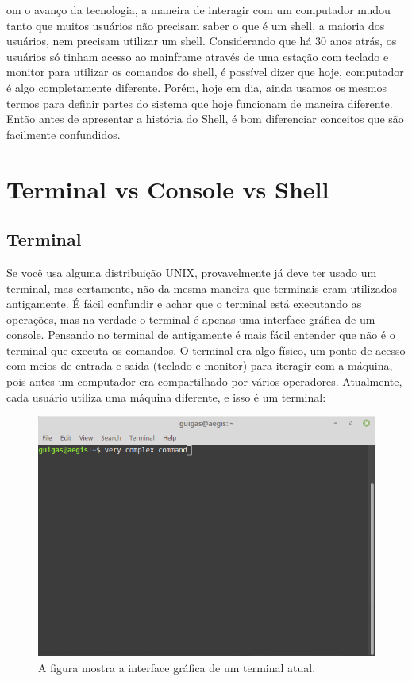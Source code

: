 	
	 om o avanço da tecnologia, a maneira de interagir com um computador mudou tanto que muitos usuários não precisam saber o que é um shell, a maioria dos usuários, nem precisam utilizar um shell.
	Considerando que há 30 anos atrás, os usuários só tinham acesso ao mainframe através de uma estação com teclado e monitor para utilizar os comandos do shell, é possível dizer que hoje, computador é algo completamente diferente. Porém, hoje em dia, ainda usamos os mesmos termos para definir partes do sistema que hoje funcionam de maneira diferente. Então antes de apresentar a história do Shell, é bom diferenciar conceitos que são facilmente confundidos.
	
	\section{Terminal vs Console vs Shell}
	
	\subsection{Terminal}
	Se você usa alguma distribuição UNIX, provavelmente já deve ter usado um terminal, mas certamente, não da mesma maneira que terminais eram utilizados antigamente. É fácil confundir e achar que o terminal está executando as operações, mas na verdade o terminal é apenas uma interface gráfica de um console. Pensando no terminal de antigamente é mais fácil entender que não é o terminal que executa os comandos. O terminal era algo físico, um ponto de acesso com meios de entrada e saída (teclado e monitor) para iteragir com a máquina, pois antes um computador era compartilhado por vários operadores.
	Atualmente, cada usuário utiliza uma máquina diferente, e isso é um terminal:
	\begin{figure}[h]
		\includegraphics[width=\linewidth]{term2.png}
		\caption{A figura mostra a interface gráfica de um terminal atual.}
		\label{fig:term1}
	\end{figure}

